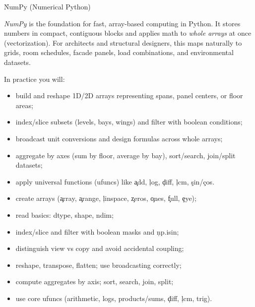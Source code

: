 
\h{NumPy (Numerical Python)}

\emph{NumPy} is the foundation for fast, array-based computing in Python. It stores numbers in compact, contiguous blocks and applies math to \emph{whole arrays} at once (vectorization). For architects and structural designers, this maps naturally to grids, room schedules, facade panels, load combinations, and environmental datasets.

In practice you will:
\begin{itemize}
\item build and reshape 1D/2D arrays representing spans, panel centers, or floor areas;
\item index/slice subsets (levels, bays, wings) and filter with boolean conditions;
\item broadcast unit conversions and design formulas across whole arrays;
\item aggregate by axes (sum by floor, average by bay), sort/search, join/split datasets;
\item apply universal functions (ufuncs) like \c{add}, \c{log}, \c{diff}, \c{lcm}, \c{sin}/\c{cos}.
\end{itemize}

\begin{tcolorbox}[%
    title=Focus of this chapter:,
    colframe=orange,
    colback = white,
    arc=2mm %
 ]
\begin{itemize}
\item create arrays (\c{array}, \c{arange}, \c{linspace}, \c{zeros}, \c{ones}, \c{full}, \c{eye});
\item read basics: dtype, shape, ndim;
\item index/slice and filter with boolean masks and \c{np.isin};
\item distinguish view vs copy and avoid accidental coupling;
\item reshape, transpose, flatten; use broadcasting correctly;
\item compute aggregates by axis; sort, search, join, split;
\item use core ufuncs (arithmetic, logs, products/sums, \c{diff}, \c{lcm}, trig).
\end{itemize}
\end{tcolorbox}

